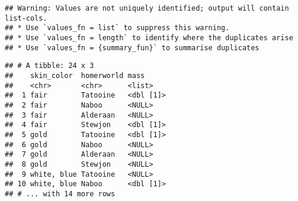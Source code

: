 \documentclass[]{book}
\newenvironment{Shaded}{\begin{snugshade}}{\end{snugshade}}
\newcommand{\DataTypeTok}[1]{\textcolor[rgb]{0.13,0.29,0.53}{#1}}
\newcommand{\DecValTok}[1]{\textcolor[rgb]{0.00,0.00,0.81}{#1}}
\newcommand{\KeywordTok}[1]{\textcolor[rgb]{0.13,0.29,0.53}{\textbf{#1}}}
\newcommand{\NormalTok}[1]{#1}
\newcommand{\OperatorTok}[1]{\textcolor[rgb]{0.81,0.36,0.00}{\textbf{#1}}}
\newcommand{\StringTok}[1]{\textcolor[rgb]{0.31,0.60,0.02}{#1}}
\begin{document}
\begin{Shaded}
\end{Shaded}

\begin{verbatim}
## Warning: Values are not uniquely identified; output will contain list-cols.
## * Use `values_fn = list` to suppress this warning.
## * Use `values_fn = length` to identify where the duplicates arise
## * Use `values_fn = {summary_fun}` to summarise duplicates
\end{verbatim}

\begin{verbatim}
## # A tibble: 24 x 3
##    skin_color  homerworld mass     
##    <chr>       <chr>      <list>   
##  1 fair        Tatooine   <dbl [1]>
##  2 fair        Naboo      <NULL>   
##  3 fair        Alderaan   <NULL>   
##  4 fair        Stewjon    <dbl [1]>
##  5 gold        Tatooine   <dbl [1]>
##  6 gold        Naboo      <NULL>   
##  7 gold        Alderaan   <NULL>   
##  8 gold        Stewjon    <NULL>   
##  9 white, blue Tatooine   <NULL>   
## 10 white, blue Naboo      <dbl [1]>
## # ... with 14 more rows
\end{verbatim}

\begin{Shaded}
\end{Shaded}
\end{document}
